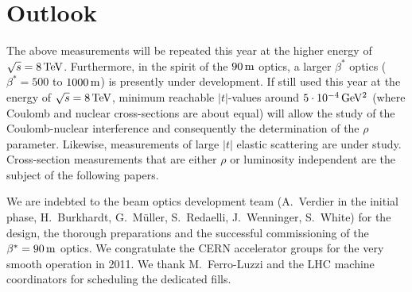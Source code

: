 \documentclass[doublecol]{../macros/epl2}
\def\un#1{\,{\rm #1}}
\begin{document}




\section{Outlook}

The above measurements will be repeated this year at the higher energy of $\sqrt s = 8\un{TeV}$. Furthermore, in the spirit of the $90\un{m}$ optics, a larger $\beta^*$ optics ($\beta^* = 500$ to $1000\un{m}$) is presently under development. If still used this year at the energy of $\sqrt s = 8\un{TeV}$, minimum reachable $|t|$-values around  $5\cdot 10^{-4}\un{GeV^2}$ (where Coulomb and nuclear cross-sections are about equal) will allow the study of the Coulomb-nuclear interference and consequently the determination of the $\rho$ parameter. Likewise, measurements of large $|t|$ elastic scattering are under study. Cross-section measurements that are either $\rho$ or luminosity independent are the subject of the following papers.



\acknowledgments

We are indebted to the beam optics development team ({\sc A.~Verdier} in the initial phase, {\sc H.~Burkhardt}, {\sc G.~M\" uller}, {\sc S.~Redaelli}, {\sc J.~Wenninger}, {\sc S.~White}) for the design, the thorough preparations and the successful commissioning of the $\beta^* = 90\un{m}$ optics. We congratulate the CERN accelerator groups for the very smooth operation in 2011. We thank {\sc M.~Ferro-Luzzi} and the LHC machine coordinators for scheduling the dedicated fills.
\end{document}
